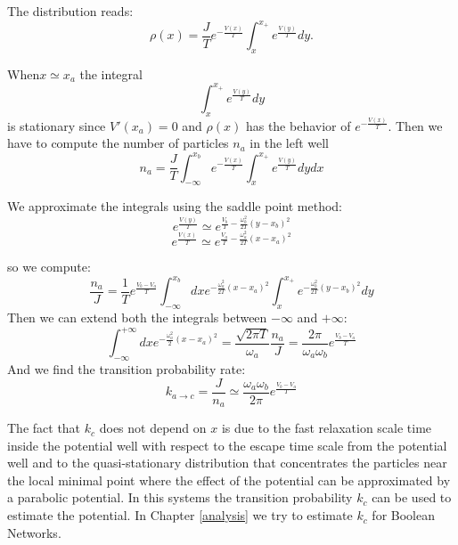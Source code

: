 The distribution reads:
$$
\rho(x) = \frac{J}{T} e^{-\frac{V(x)}{T}}\int_x^{x_{+}}e^{\frac{V(y)}{T}}dy.
$$

When$x \simeq x_a$ the integral
$$
\int_x^{x_{+}}e^{\frac{V(y)}{T}}dy
$$
is stationary since $V'(x_a) = 0$ and $\rho(x)$ has the behavior of $e^{-\frac{V(x)}{T}}$.
Then we have to compute the number of particles $n_a$ in the left well
$$
n_a = \frac{J}{T}\int_{-\infty}^{x_{b}} e^{-\frac{V(x)}{T}} \int_{x}^{x_+} e^{\frac{V(y)}{T}} dy dx
$$

We approximate the integrals using the saddle point method:
$$
e^{\frac{V(y)}{T}} \simeq e^{\frac{V_b}{T} - \frac{\omega^2_b}{2T}(y-x_b)^2}
$$
$$
e^{\frac{V(x)}{T}} \simeq e^{\frac{V_a}{T} - \frac{\omega^2_a}{2T}(x-x_a)^2}
$$

so we compute:
$$
\frac{n_a}{J} = \frac{1}{T} e^{\frac{V_b-V_a}{T}}\int_{-\infty}^{x_b}dxe^{-\frac{\omega_a^2}{2T}(x-x_a)^2}\int_x^{x_+}e^{-\frac{\omega_b^2}{2T}(y-x_b)^2 }dy
$$
Then we can extend both the integrals between $-\infty$ and $+\infty$:
$$
\int_{-\infty}^{+\infty}dxe^{-\frac{\omega_a^2}{2}(x-x_a)^2} = \frac{\sqrt{2 \pi T}}{\omega_a}\frac{n_a}{J}=\frac{2\pi}{\omega_a\omega_b}e^{\frac{V_b-V_a}{T}}
$$
And we find the transition probability rate:
$$
k_{a\to c} = \frac{J}{n_a} \simeq \frac{\omega_a \omega_b}{2 \pi} e^{\frac{V_b-V_a}{T}}
$$

The fact that $k_c$ does not depend on $x$ is due to the fast relaxation scale time inside the potential well with respect to the escape time scale from the potential well and to the quasi-stationary distribution that concentrates the particles near the local minimal point where the effect of the potential can be approximated by a parabolic potential.
In this systems the transition probability $k_c$ can be used to estimate the potential.
In Chapter \ref{analysis} we try to estimate $k_c$ for Boolean Networks.
